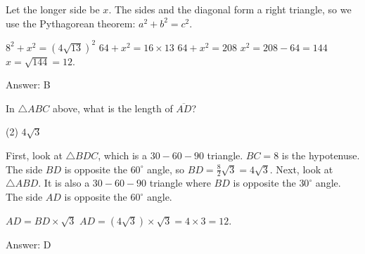 \documentclass[11pt,paper=a4,answers]{exam}
\begin{document}
\begin{questions}
\begin{solution}
Let the longer side be $x$. The sides and the diagonal form a right triangle, so we use the Pythagorean theorem: $a^2 + b^2 = c^2$.
\vspace{5pt}
\begin{center}
$8^2 + x^2 = (4\sqrt{13})^2$
\vspace{5pt}
$64 + x^2 = 16 \times 13$
\vspace{5pt}
$64 + x^2 = 208$
\vspace{5pt}
$x^2 = 208 - 64 = 144$
\vspace{5pt}
$x = \sqrt{144} = 12$.
\end{center}
\vspace{5pt}
Answer: \colorbox{yellow!100}{B}
\end{solution}

\vspace{1cm}

\question
\begin{center}
\end{center}
In $\triangle ABC$ above, what is the length of $\overline{AD}$?
\begin{tasks}(2)
    \task $4\sqrt{3}$
\end{tasks}

\begin{solution}
First, look at $\triangle BDC$, which is a $30-60-90$ triangle. $BC = 8$ is the hypotenuse. The side $BD$ is opposite the $60^\circ$ angle, so $BD = \frac{8}{2}\sqrt{3} = 4\sqrt{3}$.
\vspace{5pt}
Next, look at $\triangle ABD$. It is also a $30-60-90$ triangle where $BD$ is opposite the $30^\circ$ angle. The side $AD$ is opposite the $60^\circ$ angle.
\vspace{5pt}
\begin{center}
$AD = BD \times \sqrt{3}$
\vspace{5pt}
$AD = (4\sqrt{3}) \times \sqrt{3} = 4 \times 3 = 12$.
\end{center}
\vspace{5pt}
Answer: \colorbox{yellow!100}{D}
\end{solution}


\end{questions}
\end{document}
